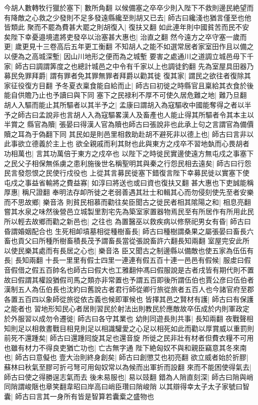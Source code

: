 今胡人數轉牧行獵於塞下|{
	數所角翻}
以候備塞之卒卒少則入陛下不救則邊民絶望而有降敵之心救之少發則不足多發遠縣纔至則胡又已去|{
	師古曰纔淺也猶言僅至也他皆類此}
聚而不罷為費甚大罷之則胡復入|{
	復扶又翻}
如此連年則中國貧苦而民不安矣陛下幸憂邉境遣將吏發卒以治塞甚大惠也|{
	治直之翻}
然今遠方之卒守塞一歲而更|{
	歲更見十三卷高后五年更工衡翻}
不知胡人之能不如選常居者家室田作且以備之以便為之高城深塹|{
	因山川地形之便而為之城塹}
要害之處通川之道調立城邑毋下千家|{
	師古曰調謂筭度之也總計城邑之中令有千家以上也調徒釣翻}
先為室屋具田器乃募民免罪拜爵|{
	謂有罪者免其罪無罪者拜爵以勸其徙}
復其家|{
	謂民之欲往者復除其家征役復方目翻}
予冬夏衣稟食能自給而止|{
	師古曰初徙之時縣官且稟給其衣食於後能自供贍乃止也予讀曰與下同}
塞下之民禄利不厚不可使久居危難之地|{
	難乃旦翻}
胡人入驅而能止其所驅者以其半予之|{
	孟康曰謂胡入為寇驅收中國能奪得之者以半予之師古曰孟說非也言胡人入為寇驅畧漢人及畜產也人能止得其所驅者令其本主以半賞之}
縣官為贖|{
	張晏曰得漢人官為贖也師古曰張說非也此承上句之言謂官為備價贖之耳為于偽翻下同}
其民如是則邑里相救助赴胡不避死非以德上也|{
	師古曰言非以此事欲立德義於主上也}
欲全親戚而利其財也此與東方之戍卒不習地埶而心畏胡者功相萬也|{
	言其功萬倍于東方之戍卒也}
以陛下之時徙民實邊使遠方無屯戍之事塞下之民父子相保無係虜之患利施後世名稱聖明其與秦之行怨民相去遠矣|{
	師古曰行怨民言發怨恨之民使行戍役也}
上從其言募民徙塞下錯復言陛下幸募民徙以實塞下使屯戍之事益省輸將之費益寡|{
	如淳曰將送也或曰資也復扶又翻}
甚大惠也下吏誠能稱厚惠|{
	稱尺證翻}
奉明法存卹所徙之老弱善遇其壯士和輯其心而勿侵刻使先至者安樂而不思故鄉|{
	樂音洛}
則貧民相慕而勸往矣臣聞古之徙民者相其隂陽之和|{
	相息亮翻}
嘗其水泉之味然後營邑立城製里割宅先為築室家置器物焉民至有所居作有所用此民所以輕去故鄉而勸之新邑也|{
	之往也}
為置醫巫以救疾病以修祭祀男女有昏|{
	師古曰昏謂婚姻配合也}
生死相卹墳墓相從種樹畜長|{
	師古曰種樹謂桑果之屬張晏曰畜長六畜也貢父曰所種所樹畜積長茂予謂畜長當從張說畜許六翻長知兩翻}
室屋完安此所以使民樂其處而有長居之心也|{
	樂音洛}
臣又聞古之制邊縣以備敵也使五家為伍伍有長|{
	長知兩翻}
十長一里里有假士四里一連連有假五百十連一邑邑有假候|{
	服䖍曰假音假借之假五百帥名也師古曰假大也工雅翻仲馮曰假服說是古者戌皆有期代則不置故曰假謂其權設猶假司馬之類亦非常置也予謂五百即後所謂伍伯也賈公彦曰伍伯者漢制五人為伍伯長也沈約曰舊說古者君行師從卿行旅從旅者五百人也今諸官府至郡各置五百四以象師從旅從依古義也候即軍候也}
皆擇其邑之賢材有護|{
	師古曰有保護之能者也}
習地形知民心者居則習民於射法出則教民於應敵故卒伍成於内則軍政定於外服習以成勿令遷徙|{
	師古曰各守其業也}
幼則同遊長則共事|{
	長知兩翻}
夜戰聲相知則足以相救晝戰目相見則足以相識驩愛之心足以相死如此而勸以厚賞威以重罰則前死不還踵矣|{
	師古曰還踵囘旋其足也還音旋}
所徙之民非壯有材者但費衣糧不可用也雖有材力不得良吏猶亡功也|{
	亡古無字通}
陛下絶匈奴不與和親臣竊意其冬來南也|{
	師古曰意儗也}
壹大治則終身創矣|{
	師古曰創懲艾也初亮翻}
欲立威者始於折膠|{
	蘇林曰秋氣至膠可折弓弩可用匈奴常以為候而出軍折而設翻}
來而不能困使得氣去|{
	師古曰使之得勝逞志氣而去}
後未易服也|{
	易以豉翻}
錯為人陗直刻深|{
	師古曰陗與峭同陗謂峻陿也章笑翻韋昭曰岸高曰峭臣瓚曰陗峻陗}
以其辯得幸太子太子家號曰智囊|{
	師古曰言其一身所有皆是智算若囊槖之盛物也}



